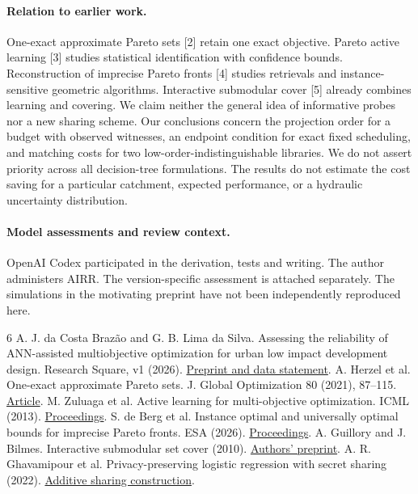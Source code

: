 \documentclass[11pt]{article}
\begin{document}
\paragraph{Relation to earlier work.} One-exact approximate Pareto sets [2] retain one exact objective. Pareto active learning [3] studies statistical identification with confidence bounds. Reconstruction of imprecise Pareto fronts [4] studies retrievals and instance-sensitive geometric algorithms. Interactive submodular cover [5] already combines learning and covering. We claim neither the general idea of informative probes nor a new sharing scheme. Our conclusions concern the projection order for a budget with observed witnesses, an endpoint condition for exact fixed scheduling, and matching costs for two low-order-indistinguishable libraries. We do not assert priority across all decision-tree formulations. The results do not estimate the cost saving for a particular catchment, expected performance, or a hydraulic uncertainty distribution.

\paragraph{Model assessments and review context.} OpenAI Codex participated in the derivation, tests and writing. The author administers AIRR. The version-specific assessment is attached separately. The simulations in the motivating preprint have not been independently reproduced here.

\begin{thebibliography}{6}\small
{} A. J. da Costa Braz\~ao and G. B. Lima da Silva. Assessing the reliability of ANN-assisted multiobjective optimization for urban low impact development design. Research Square, v1 (2026). \href{https://doi.org/10.21203/rs.3.rs-11446856/v1}{Preprint and data statement}.
 A. Herzel et al. One-exact approximate Pareto sets. J. Global Optimization 80 (2021), 87--115. \href{https://doi.org/10.1007/s10898-020-00951-7}{Article}.
 M. Zuluaga et al. Active learning for multi-objective optimization. ICML (2013). \href{https://proceedings.mlr.press/v28/zuluaga13.html}{Proceedings}.
 S. de Berg et al. Instance optimal and universally optimal bounds for imprecise Pareto fronts. ESA (2026). \href{https://doi.org/10.4230/LIPIcs.ESA.2026.106}{Proceedings}.
 A. Guillory and J. Bilmes. Interactive submodular set cover (2010). \href{https://arxiv.org/abs/1002.3345}{Authors' preprint}.
 A. R. Ghavamipour et al. Privacy-preserving logistic regression with secret sharing (2022). \href{https://doi.org/10.1186/s12911-022-01811-y}{Additive sharing construction}.
\end{thebibliography}
\end{document}
